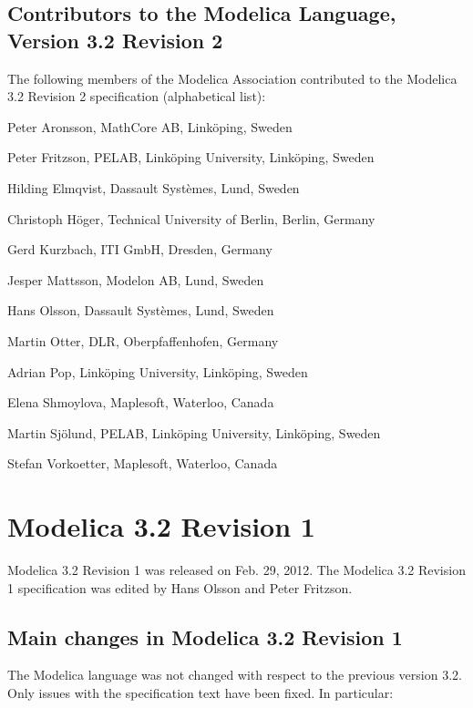 \documentclass[10pt,a4paper]{report}
\def\doublelabel#1{\label{#1}}
\begin{document}
\subsection{Contributors to the Modelica Language, Version 3.2 Revision 2}\doublelabel{contributors-to-the-modelica-language-version-3-2-revision-2}

The following members of the Modelica Association contributed to the
Modelica 3.2 Revision 2 specification (alphabetical list):

Peter Aronsson, MathCore AB, Linköping, Sweden

Peter Fritzson, PELAB, Linköping University, Linköping, Sweden

Hilding Elmqvist, Dassault Systèmes, Lund, Sweden

Christoph Höger, Technical University of Berlin, Berlin, Germany

Gerd Kurzbach, ITI GmbH, Dresden, Germany

Jesper Mattsson, Modelon AB, Lund, Sweden

Hans Olsson, Dassault Systèmes, Lund, Sweden

Martin Otter, DLR, Oberpfaffenhofen, Germany

Adrian Pop, Linköping University, Linköping, Sweden

Elena Shmoylova, Maplesoft, Waterloo, Canada

Martin Sjölund, PELAB, Linköping University, Linköping, Sweden

Stefan Vorkoetter, Maplesoft, Waterloo, Canada

\section{Modelica 3.2 Revision 1}\doublelabel{modelica-3-2-revision-1}

Modelica 3.2 Revision 1 was released on Feb. 29, 2012. The Modelica 3.2
Revision 1 specification was edited by Hans Olsson and Peter Fritzson.

\subsection{Main changes in Modelica 3.2 Revision 1}\doublelabel{main-changes-in-modelica-3-2-revision-1}

The Modelica language was not changed with respect to the previous
version 3.2. Only issues with the specification text have been fixed. In
particular:
\end{document}
